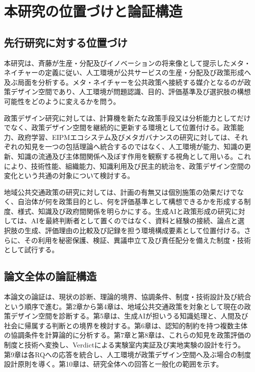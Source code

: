 \section{本研究の位置づけと論証構造}
\label{sec:intro_position}

\subsection{先行研究に対する位置づけ}
\label{subsec:intro_contribution}

本研究は、斉藤が生産・分配及びイノベーションの将来像として提示したメタ・ネイチャーの定義に従い、人工環境が公共サービスの生産・分配及び政策形成へ及ぶ局面を分析する。メタ・ネイチャーを公共政策へ接続する媒介となるのが政策デザイン空間であり、人工環境が問題認識、目的、評価基準及び選択肢の構想可能性をどのように変えるかを問う。

政策デザイン研究に対しては、計算機を新たな政策手段又は分析能力としてだけでなく、政策デザイン空間を継続的に更新する環境として位置付ける。政策能力、政府学習、EIPMエコシステム及びメタガバナンスの研究に対しては、それぞれの知見を一つの包括理論へ統合するのではなく、人工環境が能力、知識の更新、知識の流通及び主体間関係へ及ぼす作用を観察する視角として用いる。これにより、技術性能、組織能力、知識利用及び民主的統治を、政策デザイン空間の変化という共通の対象について検討する。

地域公共交通政策の研究に対しては、計画の有無又は個別施策の効果だけでなく、自治体が何を政策目的とし、何を評価基準として構想できるかを形成する制度、様式、知識及び政府間関係を明らかにする。生成AIと政策形成の研究に対しては、AIを最終判断者として置くのではなく、資料と経験の接続、論点と選択肢の生成、評価理由の比較及び記録を担う環境構成要素として位置付ける。さらに、その利用を秘密保護、検証、異議申立て及び責任配分を備えた制度・技術として試行する。

\subsection{論文全体の論証構造}
\label{subsec:intro_argument_structure}

本論文の論証は、現状の診断、理論的境界、協調条件、制度・技術設計及び統合という順序で進む。第2章から第4章は、地域公共交通政策を対象として現在の政策デザイン空間を診断する。第5章は、生成AIが担いうる知識処理と、人間及び社会に帰属する判断との境界を検討する。第6章は、認知的制約を持つ複数主体の協調条件を計算論的に分析する。第7章と第8章は、これらの知見を政策評価の制度と技術へ変換し、Verdictによる実験室内実証及び実地実験の設計を行う。第9章は各RQへの応答を統合し、人工環境が政策デザイン空間へ及ぶ場合の制度設計原則を導く。第10章は、研究全体への回答と一般化の範囲を示す。

